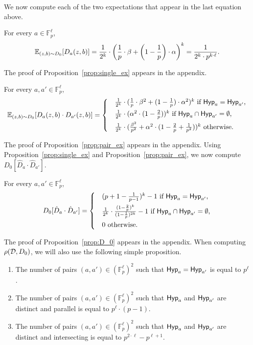 We now compute each of the two expectations that appear in the last equation above.

\begin{proposition}\label{prop:single_ex}
For every $a \in \mathbb{F}_p^{\ell}$,
$$ \mathbb E_{(z,b) \sim D_0}[D_a(z,b)] = \frac{1}{2^k} \cdot \bigg(\frac{1}{p} \cdot \beta + \bigg(1-\frac{1}{p}\bigg) \cdot \alpha\bigg)^k = \frac{1}{2^k \cdot p^{k\cdot \ell}}.$$
\end{proposition}

The proof of Proposition~\ref{prop:single_ex} appears in the appendix.

\begin{proposition}\label{prop:pair_ex}
For every $a, a' \in \mathbb{F}_p^{\ell}$,
\[
\Ex_{(z,b) \sim D_0}[D_a(z,b) \cdot D_{a'}(z,b)] = \begin{dcases*}
	& $\frac{1}{2^k} \cdot (\frac{1}{p} \cdot \beta^2 + (1-\frac{1}{p}) \cdot \alpha^2)^k$ if $\Hyp_a = \Hyp_{a'}$,\\
	& $\frac{1}{2^k}\cdot (\alpha^2 \cdot (1-\frac{2}{p}))^k$ if $\Hyp_a \cap \Hyp_{a'} = \emptyset$,\\
	& $\frac{1}{2^k} \cdot ( \frac{\beta^2}{p^2} +\alpha^2 \cdot (1-\frac{2}{p}+\frac{1}{p^2}))^k$ otherwise.
        \end{dcases*}
\]
\end{proposition}

The proof of Proposition~\ref{prop:pair_ex} appears in the appendix. Using Proposition~\ref{prop:single_ex} and Proposition~\ref{prop:pair_ex}, we now compute $D_0[\hat{D}_a \cdot \hat{D}_{a'}]$.

\begin{proposition}\label{prop:D_0}
For every $a, a' \in \mathbb{F}_p^{\ell}$,
\[
D_0[\hat{D}_a \cdot \hat{D}_{a'}] = \begin{dcases*}
	& $(p+1-\frac{1}{p-1})^k - 1$ if $\Hyp_a = \Hyp_{a'}$,\\
	& $\frac{1}{2^k} \cdot \frac{(1-\frac{2}{p})^k}{(1-\frac{1}{p})^{2k}}-1$ if $\Hyp_a \cap \Hyp_{a'} = \emptyset$,\\
	& $0$ otherwise.
        \end{dcases*}
\]
\end{proposition}

The proof of Proposition~\ref{prop:D_0} appears in the appendix. When computing $\rho(\mathcal{D},D_0)$, we will also use the following simple proposition.
\begin{proposition}\label{prop:pairs_hyp}
\begin{enumerate}
\item The number of pairs $(a,a') \in (\mathbb{F}_p^{\ell})^2$ such that $\mathsf{Hyp}_a = \mathsf{Hyp}_{a'}$ is equal to $p^{\ell}$.
\item The number of pairs $(a,a') \in (\mathbb{F}_p^{\ell})^2$ such that $\mathsf{Hyp}_a$ and $\mathsf{Hyp}_{a'}$ are distinct and parallel is equal to $p^{\ell}\cdot(p-1)$.
\item The number of pairs $(a,a') \in (\mathbb{F}_p^{\ell})^2$ such that $\mathsf{Hyp}_a$ and $\mathsf{Hyp}_{a'}$ are distinct and intersecting is equal to $p^{2\cdot \ell}-p^{\ell+1}$.
\end{enumerate}
\end{proposition}

